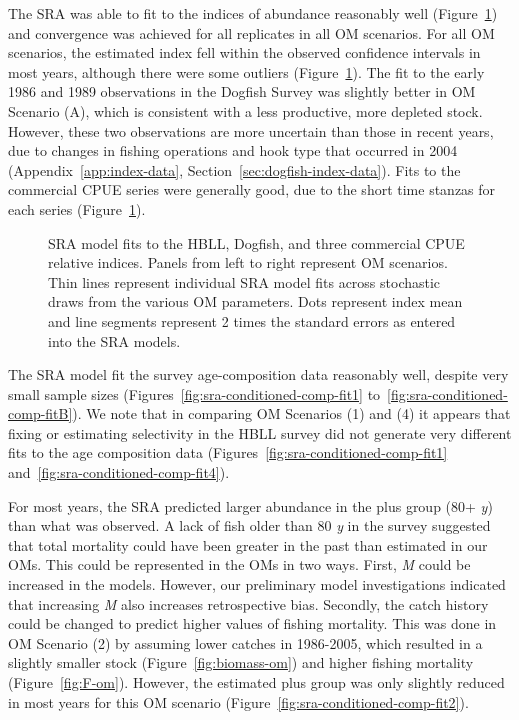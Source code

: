 \documentclass[11pt]{book}
\begin{document}
The SRA was able to fit to the indices of abundance reasonably well (Figure~\ref{fig:survey-fits}) and convergence was achieved for all replicates in all OM scenarios. For all OM scenarios, the estimated index fell within the observed confidence intervals in most years, although there were some outliers (Figure~\ref{fig:survey-fits}). The fit to the early 1986 and 1989 observations in the Dogfish Survey was slightly better in OM Scenario (A), which is consistent with a less productive, more depleted stock. However, these two observations are more uncertain than those in recent years, due to changes in fishing operations and hook type that occurred in 2004 (Appendix~\ref{app:index-data}, Section~\ref{sec:dogfish-index-data}). Fits to the commercial CPUE series were generally good, due to the short time stanzas for each series (Figure~\ref{fig:survey-fits}).


\begin{figure}[htb]

{\centering {} 

}

\caption{SRA model fits to the HBLL, Dogfish, and three commercial CPUE relative indices. Panels from left to right represent OM scenarios. Thin lines represent individual SRA model fits across stochastic draws from the various OM parameters. Dots represent index mean and line segments represent 2 times the standard errors as entered into the SRA models.}\label{fig:survey-fits}
\end{figure}
The SRA model fit the survey age-composition data reasonably well, despite very small sample sizes (Figures~\ref{fig:sra-conditioned-comp-fit1} to~\ref{fig:sra-conditioned-comp-fitB}). We note that in comparing OM Scenarios (1) and (4) it appears that fixing or estimating selectivity in the HBLL survey did not generate very different fits to the age composition data (Figures~\ref{fig:sra-conditioned-comp-fit1} and~\ref{fig:sra-conditioned-comp-fit4}).

For most years, the SRA predicted larger abundance in the plus group (80+ \emph{y}) than what was observed. A lack of fish older than 80 \emph{y} in the survey suggested that total mortality could have been greater in the past than estimated in our OMs. This could be represented in the OMs in two ways. First, \emph{M} could be increased in the models. However, our preliminary model investigations indicated that increasing \emph{M} also increases retrospective bias. Secondly, the catch history could be changed to predict higher values of fishing mortality. This was done in OM Scenario (2) by assuming lower catches in 1986-2005, which resulted in a slightly smaller stock (Figure~\ref{fig:biomass-om}) and higher fishing mortality (Figure~\ref{fig:F-om}). However, the estimated plus group was only slightly reduced in most years for this OM scenario (Figure~\ref{fig:sra-conditioned-comp-fit2}).
\end{document}
